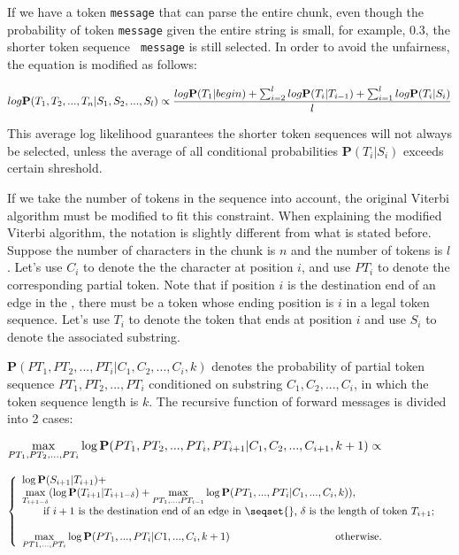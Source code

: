 If we have a token {\tt message} that can parse the entire chunk,
even though the probability of token {\tt message} given the entire
string is small, for example, 0.3, the shorter token sequence {\tt
message} is still selected. In order to avoid the unfairness, the
equation is modified as follows:

\begin{equation}
log \mathbf{P}(T_1, T_2, ..., T_n|S_1, S_2, ..., S_l) \\
\propto \frac{log \mathbf{P}(T_1|begin) +
\sum_{i=2}^{l}log \mathbf{P}(T_i|T_{i-1}) + \sum_{i=1}^{l}log
\mathbf{P}(T_i|S_i)}{l}
\end{equation}

This average log likelihood guarantees the shorter token sequences
will not always be selected, unless the average of all conditional
probabilities $\mathbf{P}(T_i|S_i)$ exceeds certain shreshold.

If we take the number of tokens in the sequence into account, the original
Viterbi algorithm must be modified to fit this constraint. When
explaining the modified Viterbi algorithm, the notation is slightly
different from what is stated before. Suppose the number of characters
in the chunk is $n$ and the number of tokens is $l$. Let's use $C_i$
to denote the the character at
position $i$, and use $PT_i$ to denote the corresponding partial
token. Note that if position $i$ is the destination end of an edge in
the \seqset{}, there must be a token whose ending position is
$i$ in a legal token sequence. Let's use $T_i$ to denote the token
that ends at position $i$ and
use $S_i$ to denote the associated substring. 

$\mathbf{P}(PT_1, PT_2, ..., PT_i|C_1, C_2, ..., C_i, k)$ denotes the
probability of partial token sequence $PT_1, PT_2, ..., PT_i$
conditioned on substring $C_1, C_2, ..., C_i$, in which the token
sequence length is $k$. The recursive function of forward messages is
divided into 2 cases:

$\\ \displaystyle{\max_{PT_1, PT_2, ..., PT_i}}\log\mathbf{P}(PT_1, PT_2, ..., PT_i,
PT_{i+1}|C_1, C_2, ..., C_{i+1}, k+1) \propto$

$\left\{
  \begin{array}{ll}
    \log \mathbf{P}(S_{i+1}|T_{i+1}) + \\
\displaystyle{\max_{T_{i+1-\delta}}}(\log\mathbf{P}(T_{i+1}|T_{i+1-\delta})
+ \displaystyle{\max_{PT_1, ...,
  PT_{i-1}}}\log\mathbf{P}(PT_1, ..., PT_i|C_1, ..., C_i, k)), 
& \\ \qquad
  \hbox{if $i+1$ is the destination end of an edge in \seqset{},
  $\delta$ is the length of token $T_{i+1}$;} \\\\
    \displaystyle{\max_{PT1, ..., PT_i}}\log\mathbf{P}(PT_1, ..., PT_i|C1, ...,
  C_i, k+1)
\qquad \qquad \qquad \qquad \qquad \hbox{otherwise.}
  \end{array}
\right. $

